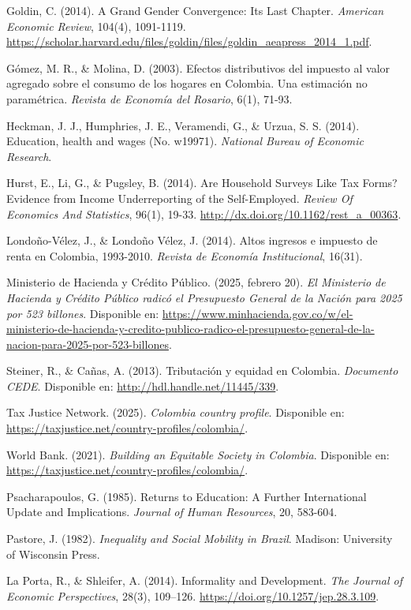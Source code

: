 \documentclass[a4paper,12pt]{article}
\begin{document}
\begin{thebibliography}{19}
Goldin, C. (2014). A Grand Gender Convergence: Its Last Chapter. \textit{American Economic Review}, 104(4), 1091-1119. \url{https://scholar.harvard.edu/files/goldin/files/goldin_aeapress_2014_1.pdf}.

Gómez, M. R., \& Molina, D. (2003). Efectos distributivos del impuesto al valor agregado sobre el consumo de los hogares en Colombia. Una estimación no paramétrica. \textit{Revista de Economía del Rosario}, 6(1), 71-93.

Heckman, J. J., Humphries, J. E., Veramendi, G., \& Urzua, S. S. (2014). Education, health and wages (No. w19971). \textit{National Bureau of Economic Research}.

Hurst, E., Li, G., \& Pugsley, B. (2014). Are Household Surveys Like Tax Forms? Evidence from Income Underreporting of the Self-Employed. \textit{Review Of Economics And Statistics}, 96(1), 19-33. \url{http://dx.doi.org/10.1162/rest_a_00363}.

Londoño-Vélez, J., \& Londoño Vélez, J. (2014). Altos ingresos e impuesto de renta en Colombia, 1993-2010. \textit{Revista de Economía Institucional}, 16(31).

Ministerio de Hacienda y Crédito Público. (2025, febrero 20). \textit{El Ministerio de Hacienda y Crédito Público radicó el Presupuesto General de la Nación para 2025 por 523 billones}. Disponible en: \url{https://www.minhacienda.gov.co/w/el-ministerio-de-hacienda-y-credito-publico-radico-el-presupuesto-general-de-la-nacion-para-2025-por-523-billones}.

Steiner, R., \& Cañas, A. (2013). Tributación y equidad en Colombia. \textit{Documento CEDE}. Disponible en: \url{http://hdl.handle.net/11445/339}.

Tax Justice Network. (2025). \textit{Colombia country profile}. Disponible en: \url{https://taxjustice.net/country-profiles/colombia/}.

World Bank. (2021). \textit{Building an Equitable Society in Colombia}. Disponible en: \url{https://taxjustice.net/country-profiles/colombia/}.

Psacharapoulos, G. (1985). Returns to Education: A Further International Update and Implications. \textit{Journal of Human Resources}, 20, 583-604.

Pastore, J. (1982). \textit{Inequality and Social Mobility in Brazil}. Madison: University of Wisconsin Press.

La Porta, R., \& Shleifer, A. (2014). Informality and Development. \textit{The Journal of Economic Perspectives}, 28(3), 109–126. \url{https://doi.org/10.1257/jep.28.3.109}.


\end{thebibliography}
\end{document}
